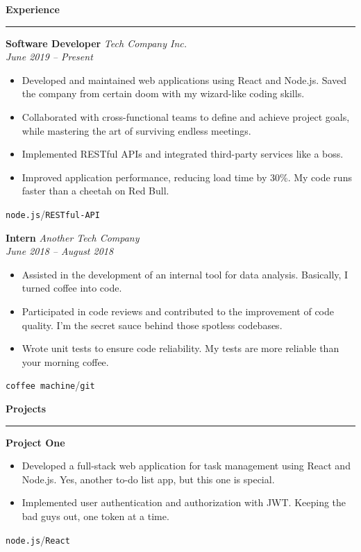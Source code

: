 \documentclass[a4paper,11pt]{article}
\newcommand{\sectiontitle}[1]{\textbf{\Large #1}\par\vspace{-1em}\noindent\rule{\linewidth}{0.3mm}\par\vspace{0.3em}}
\newcommand{\slashsep}{\hspace{3mm}/\hspace{3mm}}
\begin{document}
\begin{minipage}[t]{0.65\textwidth-0.5\columnsep}
	\vspace{1em}

	\sectiontitle{Experience}

	\textbf{\large Software Developer} \hfill \textit{Tech Company Inc.}\\
	\textit{June 2019 -- Present}
	\vspace{-0.8em}
	\begin{itemize}
		\item Developed and maintained web applications using React and Node.js. Saved the company from certain doom with my wizard-like coding skills.
		\item Collaborated with cross-functional teams to define and achieve project goals, while mastering the art of surviving endless meetings.
		\item Implemented RESTful APIs and integrated third-party services like a boss.
		\item Improved application performance, reducing load time by 30\%. My code runs faster than a cheetah on Red Bull.
	\end{itemize}
	\vspace{-0.8em}
	\texttt{node.js}\slashsep\texttt{RESTful-API}
	\vspace{0.5em}

	\textbf{\large Intern} \hfill \textit{Another Tech Company}\\
	\textit{June 2018 -- August 2018}
	\vspace{-0.8em}
	\begin{itemize}
		\item Assisted in the development of an internal tool for data analysis. Basically, I turned coffee into code.
		\item Participated in code reviews and contributed to the improvement of code quality. I'm the secret sauce behind those spotless codebases.
		\item Wrote unit tests to ensure code reliability. My tests are more reliable than your morning coffee.
	\end{itemize}
	\vspace{-0.8em}
	\texttt{coffee machine}\slashsep\texttt{git}

	\vspace{1em}

	\sectiontitle{Projects}

	\textbf{\large Project One}
	\vspace{-0.8em}
	\begin{itemize}
		\item Developed a full-stack web application for task management using React and Node.js. Yes, another to-do list app, but this one is special.
		\item Implemented user authentication and authorization with JWT. Keeping the bad guys out, one token at a time.
	\end{itemize}
	\vspace{-0.8em}
	\texttt{node.js}\slashsep\texttt{React}
	\vspace{0.5em}


\end{minipage}
\end{document}
